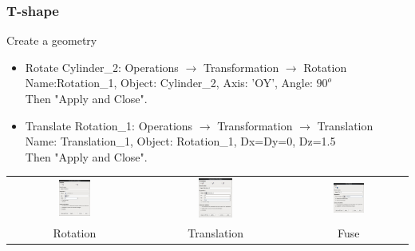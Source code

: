 \documentclass[10pt, hyperref={unicode=true,pdfusetitle, bookmarks=true,bookmarksnumbered=false,bookmarksopen=false, breaklinks=false,pdfborder={0 0 1},backref=true,colorlinks=true,linkcolor=darkblue,pageanchor}]{beamer}
\begin{document}
\begin{frame}
\frametitle{T-shape}
\begin{block}{Create a geometry}

\begin{itemize}
\item Rotate Cylinder\_2: Operations $\rightarrow$ Transformation $\rightarrow$ Rotation\\
Name:Rotation\_1, Object: Cylinder\_2, Axis: 'OY', Angle: $90^o$ \\
Then "Apply and Close".

\item Translate Rotation\_1: Operations $\rightarrow$ Transformation $\rightarrow$ Translation\\
Name: Translation\_1, Object: Rotation\_1, Dx=Dy=0, Dz=1.5 \\
Then "Apply and Close".
\end{itemize}

\begin{center}
\begin{tabular}{ccc}
\includegraphics[width=0.25\textwidth]{PICTURES/salome11} & \includegraphics[width=0.25\textwidth]{PICTURES/salome12} & \includegraphics[width=0.28\textwidth]{PICTURES/salome13} \tabularnewline
Rotation & Translation & Fuse \tabularnewline
\end{tabular}
\end{center}

\end{block}
\end{frame}
\end{document}
